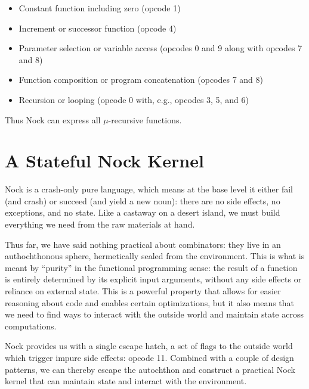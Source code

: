\begin{itemize}
  \item  Constant function including zero (opcode 1)
  \item  Increment or successor function (opcode 4)
  \item  Parameter selection or variable access (opcodes 0 and 9 along with opcodes 7 and 8)
  \item  Function composition or program concatenation (opcodes 7 and 8)
  \item  Recursion or looping (opcode 0 with, e.g., opcodes 3, 5, and 6)
\end{itemize}

\noindent
Thus Nock can express all $\mu$-recursive functions.



\section{A Stateful Nock Kernel}

Nock is a crash-only pure language, which means at the base level it either fail (and crash) or succeed (and yield a new noun):  there are no side effects, no exceptions, and no state.  Like a castaway on a desert island, we must build everything we need from the raw materials at hand.

Thus far, we have said nothing practical about combinators:  they live in an authochthonous sphere, hermetically sealed from the environment.  This is what is meant by ``purity'' in the functional programming sense:  the result of a function is entirely determined by its explicit input arguments, without any side effects or reliance on external state.  This is a powerful property that allows for easier reasoning about code and enables certain optimizations, but it also means that we need to find ways to interact with the outside world and maintain state across computations.

Nock provides us with a single escape hatch, a set of flags to the outside world which trigger impure side effects:  opcode 11.  Combined with a couple of design patterns, we can thereby escape the autochthon and construct a practical Nock kernel that can maintain state and interact with the environment.

